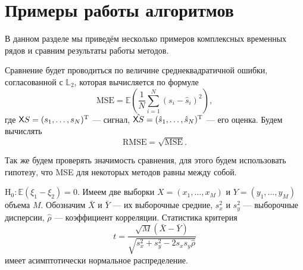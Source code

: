 \documentclass[specialist,
               substylefile = spbu.rtx,
               subf,href,colorlinks=true, 12pt]{disser}
\begin{document}
%
%

\section{Примеры работы алгоритмов}
В данном разделе мы приведём несколько примеров комплексных временных рядов и сравним результаты работы методов.

Сравнение будет проводиться по величине среднеквадратичной ошибки, согласованной с $\mathbb{L}_2$, которая вычисляется по формуле
\begin{equation}\label{MSE}
	\text{MSE} = \mathbb{E} \left(\frac{1}{N} \sum \limits_{i=1}^{N}(s_i - \hat s_i )^2 \right),
\end{equation}
где $\textsf{X}{S}=(s_1,\ldots,s_N)^\mathrm{T}$ --- сигнал, $\hat{\textsf{X}{S}}=(\hat{s}_1,\ldots,\hat{s}_N)^\mathrm{T}$ --- его оценка.
Будем вычислять
\begin{equation*}
	\text{RMSE} = \sqrt{\textrm{MSE}}.
\end{equation*}

Так же будем проверять значимость сравнения, для этого будем использовать гипотезу, что MSE для некоторых методов равны между собой.

$\mathrm{H}_0: \mathbb{E}(\xi_1-\xi_2)=0$.
Имеем две выборки $X=(x_1,\ldots,x_M)$ и $Y=(y_1,\ldots,y_M)$ объема $M$. Обозначим $\bar{X}$ и $\bar{Y}$ --- их выборочные средние, $s_x^2$ и $s_y^2$ --- выборочные дисперсии, $\hat\rho$ --- коэффициент корреляции. 
Статистика критерия 
\begin{equation*}
	t = \frac{\sqrt{M}(\bar{X}-\bar{Y})}{\sqrt{s_x^2+s_y^2-2s_xs_y\hat\rho}}
\end{equation*}
имеет асимптотически нормальное распределение.
\end{document}
